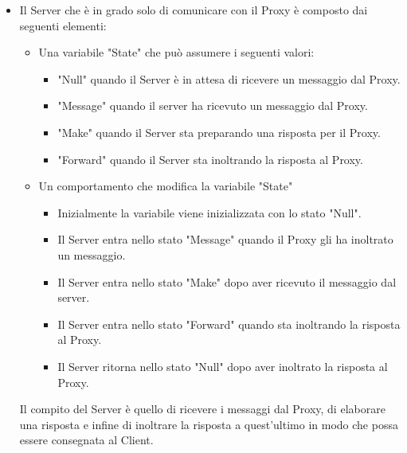 \documentclass[13pt,a4paper]{article}
\begin{document}
\begin{itemize}
	\item Il Server che è in grado solo di comunicare con il Proxy è composto dai seguenti elementi:
	\begin{itemize}
		\item Una variabile "State" che può assumere i seguenti valori:
		\begin{itemize}
			\item "Null" quando il Server è in attesa di ricevere un messaggio dal Proxy.
			\item "Message" quando il server ha ricevuto un messaggio dal Proxy.
			\item "Make" quando il Server sta preparando una risposta per il Proxy.
			\item "Forward" quando il Server sta inoltrando la risposta al Proxy.
		\end{itemize}
		\item Un comportamento che modifica la variabile "State"
		\begin{itemize}
			\item Inizialmente la variabile viene inizializzata con lo stato "Null".
			\item Il Server entra nello stato "Message" quando il Proxy gli ha inoltrato un messaggio.
			\item Il Server entra nello stato "Make" dopo aver ricevuto il messaggio dal server.
			\item Il Server entra nello stato "Forward" quando sta inoltrando la risposta al Proxy.
			\item Il Server ritorna nello stato "Null" dopo aver inoltrato la risposta al Proxy.
		\end{itemize}
	\end{itemize}
	Il compito del Server è quello di ricevere i messaggi dal Proxy, di elaborare una risposta e infine di inoltrare la risposta a quest'ultimo in modo che possa essere consegnata al Client.
\end{itemize}
\end{document}
